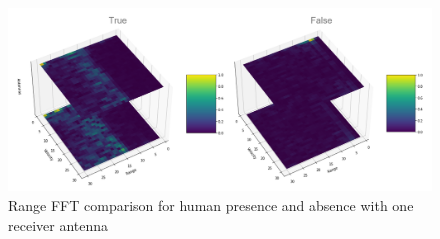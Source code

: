 \begin{figure}[ht]
  \begin{center}
    \includegraphics[width=1\textwidth]{Master's thesis/images/4d_rdfft.PNG} 
    \caption{Range FFT comparison for human presence and absence with one receiver antenna}
    \label{fig:rdFFT_4d2a}
  \end{center}
\end{figure} 